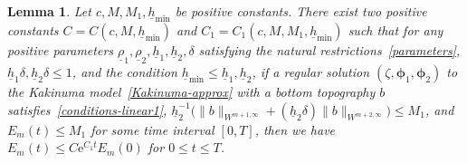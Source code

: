 \documentclass[11pt,leqno]{article}
\newtheorem{lemma}[theorem]{\bf Lemma}
\numberwithin{equation}{section}
\numberwithin{figure}{section}
\begin{document}
\begin{lemma}\label{L.energy-estimate2}
Let $c,M,M_1,\underline{h}_\mathrm{min}$ be positive constants. 
There exist two positive constants $C=C(c,M,\underline{h}_\mathrm{min})$ and $C_1=C_1(c,M,M_1,\underline{h}_\mathrm{min})$ 
such that for any positive parameters $\underline{\rho}_1, \underline{\rho}_2, \underline{h}_1, \underline{h}_2, 
\delta$ satisfying the natural restrictions~\eqref{parameters}, $\underline{h}_1\delta, \underline{h}_2\delta \leq 1$, and the condition 
${\underline{h}_\mathrm{min} \leq \underline{h}_1, \underline{h}_2}$, if a regular solution $(\zeta,\bm{\phi}_1,\bm{\phi}_2)$ 
to the Kakinuma model~\eqref{Kakinuma-approx} with a bottom topography $b$ satisfies~\eqref{conditions-linear1}, 
$\underline{h}_2^{-1}\bigl(\|b\|_{W^{m+1,\infty}} + (\underline{h}_2\delta)\|b\|_{W^{m+2,\infty}} \bigr) \leq M_1$, 
and $E_m(t) \leq M_1$ for some time interval $[0,T]$, 
then we have $E_m(t) \leq C\mathrm{e}^{C_1t}E_m(0)$ for $0\leq t\leq T$. 
\end{lemma}
\end{document}
